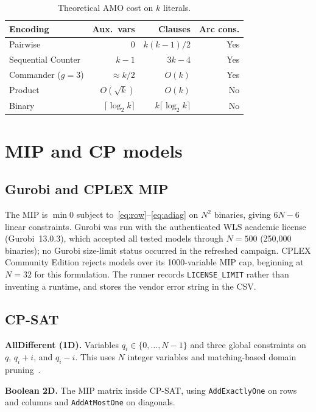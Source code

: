 \documentclass[a4paper,fleqn]{cas-sc}
\begin{document}
\begin{table}[t]
\centering
\caption{Theoretical AMO cost on $k$ literals.}
\label{tab:encoding_theory}
\begin{tabular*}{\tblwidth}{@{\extracolsep{\fill}}lrrr@{}}
\toprule
Encoding & Aux.\ vars & Clauses & Arc cons. \\
\midrule
Pairwise & $0$ & $k(k-1)/2$ & Yes \\
Sequential Counter & $k-1$ & $3k-4$ & Yes \\
Commander ($g=3$) & $\approx k/2$ & $O(k)$ & Yes \\
Product & $O(\sqrt{k})$ & $O(k)$ & No \\
Binary & $\lceil\log_2 k\rceil$ & $k\lceil\log_2 k\rceil$ & No \\
\bottomrule
\end{tabular*}
\end{table}

\section{MIP and CP models}
\label{sec:mipcp}

\subsection{Gurobi and CPLEX MIP}
The MIP is $\min 0$ subject to~\eqref{eq:row}--\eqref{eq:adiag} on $N^2$ binaries, giving $6N-6$ linear constraints.
Gurobi was run with the authenticated WLS academic license (Gurobi~13.0.3), which accepted all tested models through $N=500$ (250{,}000 binaries); no Gurobi size-limit status occurred in the refreshed campaign.
CPLEX Community Edition rejects models over its 1000-variable MIP cap, beginning at $N=32$ for this formulation.
The runner records \texttt{LICENSE\_LIMIT} rather than inventing a runtime, and stores the vendor error string in the CSV.

\subsection{CP-SAT}
\textbf{AllDifferent (1D).}
Variables $q_i\in\{0,\dots,N-1\}$ and three global constraints on $q$, $q_i+i$, and $q_i-i$.
This uses $N$ integer variables and matching-based domain pruning~\cite{regin1994filtering}.

\textbf{Boolean 2D.}
The MIP matrix inside CP-SAT, using \texttt{AddExactlyOne} on rows and columns and \texttt{AddAtMostOne} on diagonals.
\end{document}
